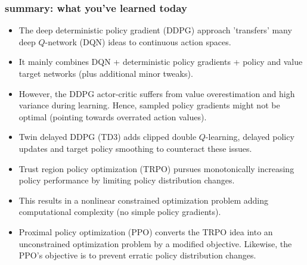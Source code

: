 \begin{frame}
\frametitle{summary: what you've learned today}
\begin{itemize}
	\item The deep deterministic policy gradient (DDPG) approach 'transfers' many deep $Q$-network (DQN) ideas to continuous action spaces.\pause
	\item It mainly combines DQN + deterministic policy gradients + policy and value target networks (plus additional minor tweaks).\pause
	\item However, the DDPG actor-critic suffers from value overestimation and high variance during learning. Hence, sampled policy gradients might not be optimal (pointing towards overrated action values).\pause
	\item Twin delayed DDPG (TD3) adds clipped double $Q$-learning, delayed policy updates and target policy smoothing to counteract these issues.\pause
	\item Trust region policy optimization (TRPO) pursues monotonically increasing policy performance by limiting policy distribution changes.\pause
	\item This results in a nonlinear constrained optimization problem adding computational complexity (no simple policy gradients).\pause
	\item Proximal policy optimization (PPO) converts the TRPO idea into an unconstrained optimization problem by a modified objective. Likewise, the PPO's objective is to prevent erratic policy distribution changes. 
\end{itemize}
\end{frame}

